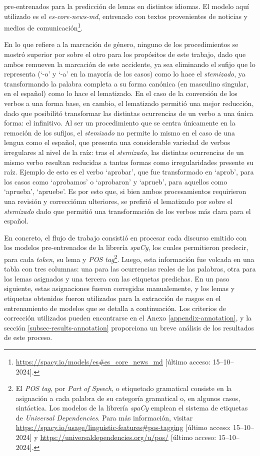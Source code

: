 pre-entrenados para la predicci\'on de lemas en distintos idiomas. El modelo aqu\'i
utilizado es el \textit{es-core-news-md}, entrenado con textos
provenientes de noticias y medios de
comunicaci\'on\footnote{\url{https://spacy.io/models/es\#es_core_news_md}
[\'ultimo acceso: 15--10--2024].}.
\par
En lo que refiere a la marcaci\'on de g\'enero, ninguno de los procedimientos se mostr\'o
superior por sobre el otro para los prop\'ositos de este trabajo, dado que ambos
remueven la marcaci\'on de este accidente, ya sea eliminando el sufijo que lo
representa (`-o' y `-a' en la mayor\'ia de los casos) como lo hace el
\textit{stemizado}, ya transformando la palabra completa a su forma can\'onica
(en masculino singular, en el español) como lo hace el lematizado. En el caso
de la conversi\'on de los verbos a una forma base, en cambio, el lematizado permiti\'o
una mejor reducci\'on, dado que posibilit\'o transformar las distintas ocurrencias
de un verbo a una \'unica forma: el infinitivo. Al ser un procedimiento que se
centra \'unicamente en la remoci\'on de los sufijos, el \textit{stemizado} no permite
lo mismo en el caso de una lengua como el español, que presenta una considerable
variedad de verbos irregulares al nivel de la ra\'iz: tras el
\textit{stemizado}, las distintas ocurrencias de un mismo verbo resultan reducidas
a tantas formas como irregularidades presente su ra\'iz. Ejemplo de esto es el
verbo `aprobar', que fue transformado en `aprob', para los casos como
`aprobamos' o `aprobaron' y `aprueb', para aquellos como `aprueba',
`apruebe'. Es por esto que, si bien ambos procesamientos requirieron una revisi\'on
y correcci\'omn ulteriores, se prefiri\'o el lematizado por sobre el \textit{stemizado}
dado que permiti\'o una transformaci\'on de los verbos m\'as clara para el español.
\par
En concreto, el flujo de trabajo consisti\'o en procesar cada discurso emitido
con los modelos pre-entrenados de la librer\'ia \textit{spaCy}, los cuales permitieron
predecir, para cada \textit{token}, su lema y \textit{POS tag}\footnote{El
\textit{POS tag}, por \textit{Part of Speech}, o etiquetado gramatical consiste
en la asignaci\'on a cada palabra de su categor\'ia gramatical o, en algunos casos,
sint\'actica. Los modelos de la
librer\'ia \textit{spaCy} emplean el sistema de etiquetas de \textit{Universal Dependencies}.
Para m\'as informaci\'on, visitar
\url{https://spacy.io/usage/linguistic-features\#pos-tagging}
[\'ultimo acceso: 15--10--2024]
y \url{https://universaldependencies.org/u/pos/}
[\'ultimo acceso: 15--10--2024].}. Luego, esta
informaci\'on fue volcada en una tabla con tres columnas: una para las ocurrencias
reales de las palabras, otra para los lemas asignados y una tercera con las etiquetas predichas. En un paso siguiente, estas asignaciones fueron corregidas
manualemente, y los lemas y etiquetas obtenidos fueron utilizados para la
extracci\'on de rasgos en el entrenamiento de modelos que se detalla a continuaci\'on.
Los criterios de correcci\'on utilizados pueden encontrarse en el Anexo
\ref{appendix-annotation}, y la secci\'on \ref{subsec-results-annotation}
proporciona un breve an\'alisis de los resultados de este proceso.
